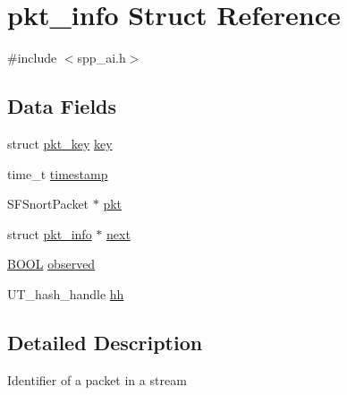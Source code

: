 \hypertarget{structpkt__info}{
\section{pkt\_\-info Struct Reference}
\label{structpkt__info}
}


{\ttfamily \#include $<$spp\_\-ai.h$>$}

\subsection*{Data Fields}
\begin{DoxyCompactItemize}
\item 
struct \hyperlink{structpkt__key}{pkt\_\-key} \hyperlink{structpkt__info_a231d4734d3c62292b06eb9ea4b49c339}{key}
\item 
time\_\-t \hyperlink{structpkt__info_a7f5090443f21e6290f0439f1bb872e92}{timestamp}
\item 
SFSnortPacket $\ast$ \hyperlink{structpkt__info_a8d5ebd04a32067b05387e5c5056fe168}{pkt}
\item 
struct \hyperlink{structpkt__info}{pkt\_\-info} $\ast$ \hyperlink{structpkt__info_a5ee3c51f2ca5768b94819182641ef168}{next}
\item 
\hyperlink{spp__ai_8h_a3e5b8192e7d9ffaf3542f1210aec18dd}{BOOL} \hyperlink{structpkt__info_ac7ff78ea5faf333fc91f92e3085ea7c9}{observed}
\item 
UT\_\-hash\_\-handle \hyperlink{structpkt__info_a264e90d4b5d490de040f38c1072e142f}{hh}
\end{DoxyCompactItemize}


\subsection{Detailed Description}
Identifier of a packet in a stream 

